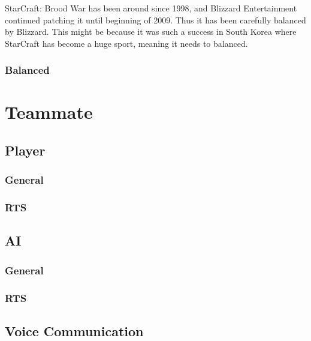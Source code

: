 StarCraft: Brood War has been around since 1998, and Blizzard Entertainment continued patching it until beginning of 2009.
Thus it has been carefully balanced by Blizzard. This might be because it was such a success in South Korea where StarCraft has become a huge sport, meaning it needs to balanced.

\subsubsection{Balanced}

\section{Teammate}

\subsection{Player}

\subsubsection{General}

\subsubsection{RTS}

\subsection{AI}

\subsubsection{General}

\subsubsection{RTS}

\subsection{Voice Communication}